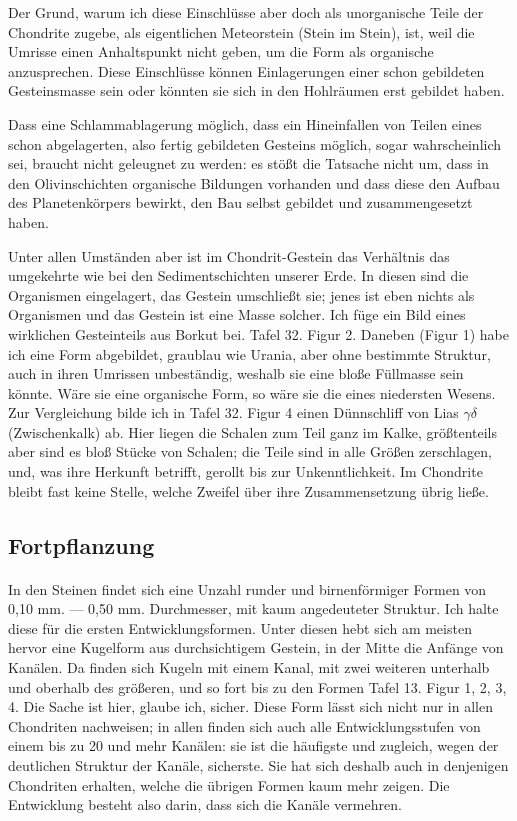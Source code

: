 \documentclass[a4paper, 12pt, oneside]{article}
\begin{document}
Der Grund, warum ich diese Einschlüsse aber doch als unorganische Teile der Chondrite zugebe, als eigentlichen Meteorstein (Stein im Stein), ist, weil die Umrisse einen Anhaltspunkt nicht geben, um die Form als organische anzusprechen. Diese Einschlüsse können Einlagerungen einer schon gebildeten Gesteinsmasse sein oder könnten sie sich in den Hohlräumen erst gebildet haben.

Dass eine Schlammablagerung möglich, dass ein Hineinfallen von Teilen eines schon abgelagerten, also fertig gebildeten Gesteins möglich, sogar wahrscheinlich sei, braucht nicht geleugnet zu werden: es stößt die Tatsache nicht um, dass in den Olivinschichten organische Bildungen vorhanden und dass diese den Aufbau des Planetenkörpers bewirkt, den Bau selbst gebildet und zusammengesetzt haben.

Unter allen Umständen aber ist im Chondrit-Gestein das Verhältnis das umgekehrte wie bei den Sedimentschichten unserer Erde. In diesen sind die Organismen eingelagert, das Gestein umschließt sie; jenes ist eben nichts als Organismen und das Gestein ist eine Masse solcher. Ich füge ein Bild eines wirklichen Gesteinteils aus Borkut bei. Tafel 32. Figur 2. Daneben (Figur 1) habe ich eine Form abgebildet, graublau wie Urania, aber ohne bestimmte Struktur, auch in ihren Umrissen unbeständig, weshalb sie eine bloße Füllmasse sein könnte. Wäre sie eine organische Form, so wäre sie die eines niedersten Wesens. Zur Vergleichung bilde ich in Tafel 32. Figur 4 einen Dünnschliff von Lias $\gamma\delta$ (Zwischenkalk) ab. Hier liegen die Schalen zum Teil ganz im Kalke, größtenteils aber sind es bloß Stücke von Schalen; die Teile sind in alle Größen zerschlagen, und, was ihre Herkunft betrifft, gerollt bis zur Unkenntlichkeit. Im Chondrite bleibt fast keine Stelle, welche Zweifel über ihre Zusammensetzung übrig ließe.
\clearpage
\subsection{Fortpflanzung}
\paragraph{}
In den Steinen findet sich eine Unzahl runder und birnenförmiger Formen von 0,10 mm. — 0,50 mm. Durchmesser, mit kaum angedeuteter Struktur. Ich halte diese für die ersten Entwicklungsformen. Unter diesen hebt sich am meisten hervor eine Kugelform aus durchsichtigem Gestein, in der Mitte die Anfänge von Kanälen. Da finden sich Kugeln mit einem Kanal, mit zwei weiteren unterhalb und oberhalb des größeren, und so fort bis zu den Formen Tafel 13. Figur 1, 2, 3, 4. Die Sache ist hier, glaube ich, sicher. Diese Form lässt sich nicht nur in allen Chondriten nachweisen; in allen finden sich auch alle Entwicklungsstufen von einem bis zu 20 und mehr Kanälen: sie ist die häufigste und zugleich, wegen der deutlichen Struktur der Kanäle, sicherste. Sie hat sich deshalb auch in denjenigen Chondriten erhalten, welche die übrigen Formen kaum mehr zeigen. Die Entwicklung besteht also darin, dass sich die Kanäle vermehren.
\end{document}
